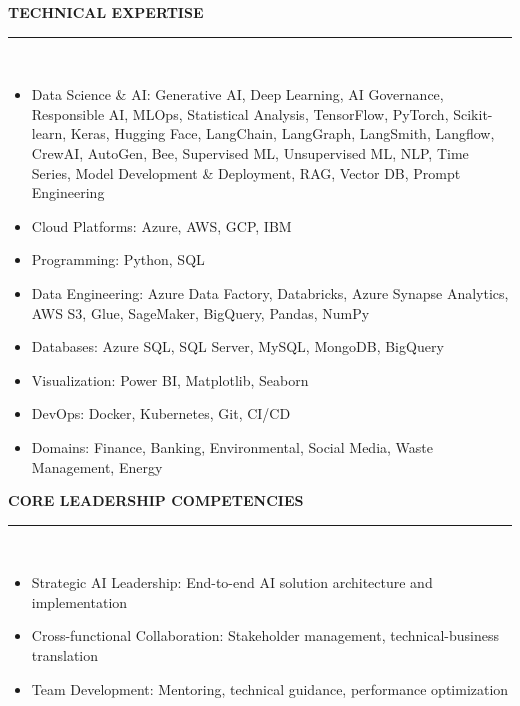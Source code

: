 \documentclass[a4paper,9pt]{article}
\newcommand{\cvsection}[2]{%
  \vspace{4pt}
  {\color{primary}\faIcon{#1}\hspace{6pt}\textbf{\fontsize{10pt}{12pt}\selectfont\uppercase{#2}}}\\[-2pt]
  \color{primary}\rule{\linewidth}{0.8pt}\\[-2pt]
  \color{textcolor}
}
\begin{document}
\begin{paracol}{2}
  \cvsection{tools}{Technical Expertise}
  \small
  \begin{itemize}
    \item Data Science \& AI: Generative AI, Deep Learning, AI Governance, Responsible AI, MLOps, Statistical Analysis, TensorFlow, PyTorch, Scikit-learn, Keras, Hugging Face, LangChain, LangGraph, LangSmith, Langflow, CrewAI, AutoGen, Bee, Supervised ML, Unsupervised ML, NLP, Time Series, Model Development \& Deployment, RAG, Vector DB, Prompt Engineering
    \item Cloud Platforms: Azure, AWS, GCP, IBM
    \item Programming: Python, SQL
    \item Data Engineering: Azure Data Factory, Databricks, Azure Synapse Analytics, AWS S3, Glue, SageMaker, BigQuery, Pandas, NumPy
    \item Databases: Azure SQL, SQL Server, MySQL, MongoDB, BigQuery
    \item Visualization: Power BI, Matplotlib, Seaborn
    \item DevOps: Docker, Kubernetes, Git, CI/CD
    \item Domains: Finance, Banking, Environmental, Social Media, Waste Management, Energy
  \end{itemize}

  \cvsection{star}{Core Leadership Competencies}
  \small
  \begin{itemize}
    \item Strategic AI Leadership: End-to-end AI solution architecture and implementation
    \item Cross-functional Collaboration: Stakeholder management, technical-business translation
    \item Team Development: Mentoring, technical guidance, performance optimization
  \end{itemize}

\end{paracol}
\end{document}
